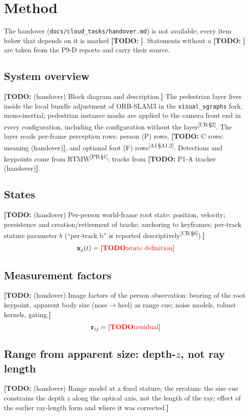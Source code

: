 \documentclass[journal]{IEEEtran}
\newcommand{\TODO}[1]{{\color{red}\textbf{[TODO:} #1\textbf{]}}}
\newcommand{\src}[1]{\textsuperscript{\color{blue}\scriptsize[#1]}}
\begin{document}
\section{Method}
\label{sec:method}

The handover (\texttt{docs/cloud\_tasks/handover.md}) is not available; every
item below that depends on it is marked \TODO{}. Statements without a
\TODO{} are taken from the P9-D reports and carry their source.

\subsection{System overview}
\TODO{(handover) Block diagram and description.} The pedestrian layer lives
inside the local bundle adjustment of ORB-SLAM3 in the \texttt{visual\_sgraphs}
fork, mono-inertial; pedestrian instance masks are applied to the camera
front end in every configuration, including the configuration without the
layer\src{CR\,\S2}. The layer reads per-frame perception rows: person (P) rows,
\TODO{C rows: meaning (handover)}, and optional foot (F) rows\src{A1\,\S A1.2}.
Detections and keypoints come from RTMW\src{PR\,\S1}; tracks from
\TODO{P1-A tracker (handover)}.

\subsection{States}
\TODO{(handover) Per-person world-frame root state: position, velocity;
persistence and creation/retirement of tracks; anchoring to keyframes;
per-track stature parameter $b$ (``per-track b'' is reported
descriptively\src{CR\,\S6}).}
\begin{equation}
  \mathbf{x}_{j}(t) = \TODO{\text{state definition}}
\end{equation}

\subsection{Measurement factors}
\TODO{(handover) Image factors of the person observation: bearing of the root
keypoint, apparent body size (nose$\to$heel) as range cue; noise models,
robust kernels, gating.}
\begin{equation}
  \mathbf{r}_{ij} = \TODO{\text{residual}}
\end{equation}

\subsection{Range from apparent size: depth-$z$, not ray length}
\TODO{(handover) Range model at a fixed stature; the erratum: the size cue
constrains the depth $z$ along the optical axis, not the length of the ray;
effect of the earlier ray-length form and where it was corrected.}
\end{document}
